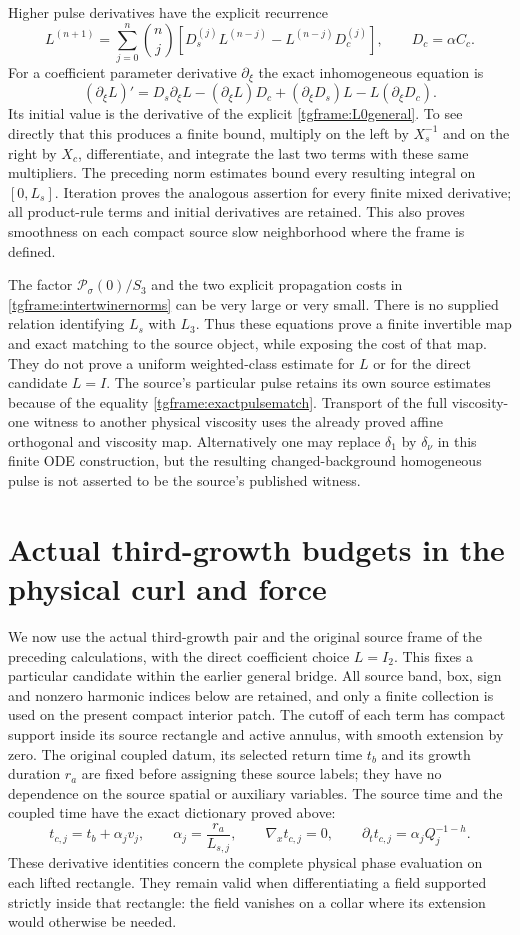 \documentclass[11pt]{article}
\begin{document}
Higher pulse derivatives have the explicit recurrence
\[
 L^{(n+1)}=
 \sum_{j=0}^n\binom nj\left[
 D_s^{(j)}L^{(n-j)}-L^{(n-j)}D_c^{(j)}\right],
 \qquad D_c=\alpha C_c .
\]
For a coefficient parameter derivative $\partial_\xi$ the exact
inhomogeneous equation is
\[
 (\partial_\xi L)'=D_s\partial_\xi L
       -(\partial_\xi L)D_c
       +(\partial_\xi D_s)L-L(\partial_\xi D_c).
\]
Its initial value is the derivative of the explicit
\eqref{tgframe:L0general}. To see directly that this produces a finite
bound, multiply on the left by $X_s^{-1}$ and on the right by $X_c$,
differentiate, and integrate the last two terms with these same
multipliers. The preceding norm estimates bound every resulting
integral on $[0,L_s]$. Iteration proves the analogous assertion for
every finite mixed derivative; all product-rule terms and initial
derivatives are retained. This also proves smoothness on each compact
source slow neighborhood where the frame is defined.

The factor $\mathcal P_\sigma(0)/S_3$ and the two explicit propagation
costs in \eqref{tgframe:intertwinernorms} can be very large or very small.
There is no supplied relation identifying $L_s$ with $L_3$.
Thus these equations prove a finite invertible map and exact matching
to the source object, while exposing the cost of that map. They do not
prove a uniform weighted-class estimate for $L$ or for the direct
candidate $L=I$. The source's particular pulse retains its own source
estimates because of the equality \eqref{tgframe:exactpulsematch}.
Transport of the full viscosity-one witness to another physical
viscosity uses the already proved affine orthogonal and viscosity map.
Alternatively one may replace $\delta_1$ by $\delta_\nu$ in this
finite ODE construction, but the resulting changed-background
homogeneous pulse is not asserted to be the source's published witness.


\section{Actual third-growth budgets in the physical curl and force}
\label{tgq:section}
We now use the actual third-growth pair and the original source frame
of the preceding calculations, with the direct coefficient choice
$L=I_2$. This fixes a particular candidate within the earlier general
bridge. All source band, box, sign and nonzero harmonic indices below
are retained, and only a finite collection is used on the present compact
interior patch. The cutoff of each term has compact support inside its
source rectangle and active annulus, with smooth extension by zero.
The original coupled datum, its selected return time $t_b$ and its
growth duration $r_a$ are fixed before assigning these source labels;
they have no dependence on the source spatial or auxiliary variables.
The source time and the coupled time have the exact dictionary proved
above:
\[
 t_{c,j}=t_b+\alpha_jv_j,\qquad
 \alpha_j=\frac{r_a}{L_{s,j}},\qquad
 \nabla_x t_{c,j}=0,\qquad
 \partial_t t_{c,j}=\alpha_jQ_j^{-1-h}.
\]
These derivative identities concern the complete physical phase
evaluation on each lifted rectangle. They remain valid when differentiating
a field supported strictly inside that rectangle: the field vanishes on
a collar where its extension would otherwise be needed.
\end{document}
